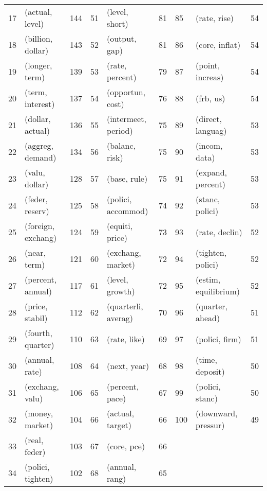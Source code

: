 \begin{tabular}{rlrrlrlll}
 17 &     (actual, level) &   144 &  51 &         (level, short) &    81 &   85 &          (rate, rise) &    54 \\
 18 &   (billion, dollar) &   143 &  52 &          (output, gap) &    81 &   86 &        (core, inflat) &    54 \\
 19 &      (longer, term) &   139 &  53 &        (rate, percent) &    79 &   87 &      (point, increas) &    54 \\
 20 &    (term, interest) &   137 &  54 &       (opportun, cost) &    76 &   88 &             (frb, us) &    54 \\
 21 &    (dollar, actual) &   136 &  55 &    (intermeet, period) &    75 &   89 &     (direct, languag) &    53 \\
 22 &    (aggreg, demand) &   134 &  56 &         (balanc, risk) &    75 &   90 &         (incom, data) &    53 \\
 23 &      (valu, dollar) &   128 &  57 &           (base, rule) &    75 &   91 &     (expand, percent) &    53 \\
 24 &     (feder, reserv) &   125 &  58 &     (polici, accommod) &    74 &   92 &       (stanc, polici) &    53 \\
 25 &  (foreign, exchang) &   124 &  59 &        (equiti, price) &    73 &   93 &        (rate, declin) &    52 \\
 26 &        (near, term) &   121 &  60 &      (exchang, market) &    72 &   94 &     (tighten, polici) &    52 \\
 27 &   (percent, annual) &   117 &  61 &        (level, growth) &    72 &   95 &  (estim, equilibrium) &    52 \\
 28 &     (price, stabil) &   112 &  62 &    (quarterli, averag) &    70 &   96 &      (quarter, ahead) &    51 \\
 29 &   (fourth, quarter) &   110 &  63 &           (rate, like) &    69 &   97 &        (polici, firm) &    51 \\
 30 &      (annual, rate) &   108 &  64 &           (next, year) &    68 &   98 &       (time, deposit) &    50 \\
 31 &     (exchang, valu) &   106 &  65 &        (percent, pace) &    67 &   99 &       (polici, stanc) &    50 \\
 32 &     (money, market) &   104 &  66 &       (actual, target) &    66 &  100 &   (downward, pressur) &    49 \\
 33 &       (real, feder) &   103 &  67 &            (core, pce) &    66 &      &                       &       \\
 34 &   (polici, tighten) &   102 &  68 &         (annual, rang) &    65 &      &                       &       \\
\bottomrule
\end{tabular}
